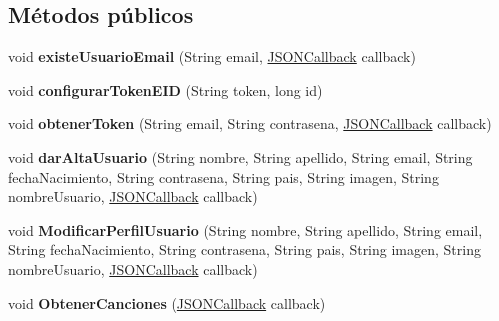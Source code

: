 \subsection*{Métodos públicos}
\begin{DoxyCompactItemize}
\item 
\mbox{\label{classcom_1_1example_1_1mediaio_1_1mediaio_1_1modelo_1_1_shared_server_a2c323a3b687cd93bc37169851613677e}} 
void {\bfseries existe\+Usuario\+Email} (String email, \hyperlink{classcom_1_1example_1_1mediaio_1_1mediaio_1_1modelo_1_1_j_s_o_n_callback}{J\+S\+O\+N\+Callback} callback)
\item 
\mbox{\label{classcom_1_1example_1_1mediaio_1_1mediaio_1_1modelo_1_1_shared_server_a38f784bc140a89baeaf7786a1b468ffa}} 
void {\bfseries configurar\+Token\+E\+ID} (String token, long id)
\item 
\mbox{\label{classcom_1_1example_1_1mediaio_1_1mediaio_1_1modelo_1_1_shared_server_a40a577740aa2136f26ccd90a64910724}} 
void {\bfseries obtener\+Token} (String email, String contrasena, \hyperlink{classcom_1_1example_1_1mediaio_1_1mediaio_1_1modelo_1_1_j_s_o_n_callback}{J\+S\+O\+N\+Callback} callback)
\item 
\mbox{\label{classcom_1_1example_1_1mediaio_1_1mediaio_1_1modelo_1_1_shared_server_af6d66c9c68d0cbc41ac6fc9199c332b8}} 
void {\bfseries dar\+Alta\+Usuario} (String nombre, String apellido, String email, String fecha\+Nacimiento, String contrasena, String pais, String imagen, String nombre\+Usuario, \hyperlink{classcom_1_1example_1_1mediaio_1_1mediaio_1_1modelo_1_1_j_s_o_n_callback}{J\+S\+O\+N\+Callback} callback)
\item 
\mbox{\label{classcom_1_1example_1_1mediaio_1_1mediaio_1_1modelo_1_1_shared_server_a0c1fe1f85a8dd9ac72b9bbb1099295c4}} 
void {\bfseries Modificar\+Perfil\+Usuario} (String nombre, String apellido, String email, String fecha\+Nacimiento, String contrasena, String pais, String imagen, String nombre\+Usuario, \hyperlink{classcom_1_1example_1_1mediaio_1_1mediaio_1_1modelo_1_1_j_s_o_n_callback}{J\+S\+O\+N\+Callback} callback)
\item 
\mbox{\label{classcom_1_1example_1_1mediaio_1_1mediaio_1_1modelo_1_1_shared_server_aacbe1fbbc2a6ebe9faa433f7ea52ea69}} 
void {\bfseries Obtener\+Canciones} (\hyperlink{classcom_1_1example_1_1mediaio_1_1mediaio_1_1modelo_1_1_j_s_o_n_callback}{J\+S\+O\+N\+Callback} callback)
\end{DoxyCompactItemize}
